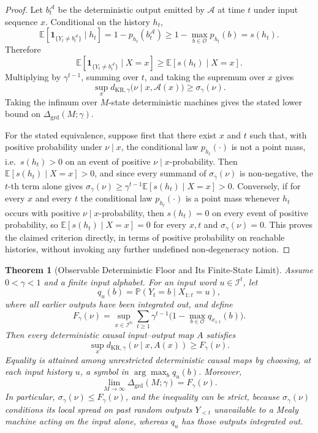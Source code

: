 \documentclass[12pt]{article}
\newtheorem{theorem}{Theorem}[section]
\theoremstyle{definition}
\begin{document}
\begin{proof}
Let $b_t^{\mathcal A}$ be the deterministic output emitted by $\mathcal A$ at
time $t$ under input sequence $x$.  Conditional on the history $h_t$,
\[
\mathbb E[
\mathbf 1_{\{Y_t\neq b_t^{\mathcal A}\}}
\mid h_t
]
=
1-p_{h_t}(b_t^{\mathcal A})
\ge
1-\max_{b\in\mathcal O}p_{h_t}(b)
=
s(h_t).
\]
Therefore
\[
\mathbb E[
\mathbf 1_{\{Y_t\neq b_t^{\mathcal A}\}}
\mid X=x
]
\ge
\mathbb E[
s(h_t)\mid X=x
].
\]
Multiplying by $\gamma^{t-1}$, summing over $t$, and taking the supremum over
$x$ gives
\[
\sup_x
d_{\mathrm{KR},\gamma}
\bigl(
\nu\mid x,\mathcal A(x)
\bigr)
\ge
\sigma_\gamma(\nu).
\]
Taking the infimum over $M$-state deterministic machines gives the stated
lower bound on $\Delta_{\mathrm{grd}}(M;\gamma)$.

For the stated equivalence, suppose first that there exist $x$ and $t$ such
that, with positive probability under $\nu\mid x$, the conditional law
$p_{h_t}(\cdot)$ is not a point mass, i.e.\ $s(h_t)>0$ on an event of
positive $\nu\mid x$-probability.  Then $\mathbb E[s(h_t)\mid X=x]>0$, and
since every summand of $\sigma_\gamma(\nu)$ is non-negative, the $t$-th term
alone gives $\sigma_\gamma(\nu)\ge\gamma^{t-1}\mathbb E[s(h_t)\mid X=x]>0$.
Conversely, if for every $x$ and every $t$ the conditional law
$p_{h_t}(\cdot)$ is a point mass whenever $h_t$ occurs with positive
$\nu\mid x$-probability, then $s(h_t)=0$ on every event of positive
probability, so $\mathbb E[s(h_t)\mid X=x]=0$ for every $x,t$ and
$\sigma_\gamma(\nu)=0$.  This proves the claimed criterion directly, in terms
of positive probability on reachable histories, without invoking any further
undefined non-degeneracy notion.
\end{proof}

\begin{theorem}[Observable Deterministic Floor and Its Finite-State Limit]
\label{thm:observable-floor}
Assume $0<\gamma<1$ and a finite input alphabet.  For an input word
$u\in\mathcal I^t$, let
\[
q_u(b)=\mathbb P(Y_t=b\mid X_{1:t}=u),
\]
where all earlier outputs have been integrated out, and define
\[
F_\gamma(\nu)=
\sup_{x\in\mathcal I^{\mathbb N}}
\sum_{t\ge1}\gamma^{t-1}
\bigl(1-\max_{b\in\mathcal O}q_{x_{1:t}}(b)\bigr).
\]
Then every deterministic causal input--output map $A$ satisfies
\[
\sup_x d_{\mathrm{KR},\gamma}(\nu\mid x,A(x))\ge F_\gamma(\nu).
\]
Equality is attained among unrestricted deterministic causal maps by
choosing, at each input history $u$, a symbol in $\arg\max_bq_u(b)$.
Moreover,
\[
\lim_{M\to\infty}\Delta_{\mathrm{grd}}(M;\gamma)=F_\gamma(\nu).
\]
In particular, $\sigma_\gamma(\nu)\le F_\gamma(\nu)$, and the inequality can
be strict, because $\sigma_\gamma(\nu)$ conditions its local spread on past
random outputs $Y_{<t}$ unavailable to a Mealy machine acting on the input
alone, whereas $q_u$ has those outputs integrated out.
\end{theorem}
\end{document}

